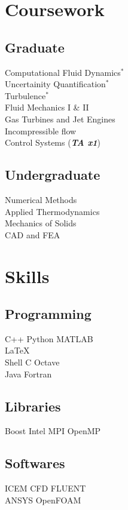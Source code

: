 \documentclass[]{resume}
\begin{document}
\begin{minipage}[t]{0.33\textwidth}

\section{Coursework}
\subsection{Graduate}
Computational Fluid Dynamics$^*$ \\
Uncertainity Quantification$^*$ \\
Turbulence$^*$ \\
Fluid Mechanics I \& II \\
Gas Turbines and Jet Engines \\
Incompressible flow \\
Control Systems (\textbf{\textit{TA x1}}) \\
\sectionsep

\subsection{Undergraduate}
Numerical Methods \\
Applied Thermodynamics \\
Mechanics of Solids \\
CAD and FEA \\


\section{Skills}
\subsection{Programming}
C++ \textbullet{} Python \textbullet{} MATLAB \\
\LaTeX\ \textbullet{} \\
Shell \textbullet{} C \textbullet{} Octave  \\
Java \textbullet{} Fortran \\
\sectionsep
\subsection{Libraries}
Boost \textbullet{} Intel MPI \textbullet{} OpenMP \\
\sectionsep
\subsection{Softwares}
ICEM CFD \textbullet{} FLUENT \textbullet{} \\
ANSYS \textbullet{} OpenFOAM \\
\sectionsep

%
%

\end{minipage}
\end{document}
